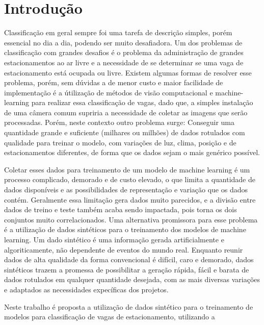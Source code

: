 \chapter{Introdução}



Classificação em geral sempre foi uma tarefa de descrição simples, porém essencial no dia a dia, podendo ser muito desafiadora. Um dos problemas de
classificação com grandes desafios é o problema da administração de grandes estacionamentos ao ar livre e a necessidade de se determinar se uma vaga de 
estacionamento está ocupada ou livre. Existem algumas formas de resolver esse problema, porém, sem dúvidas a de menor custo e maior facilidade de implementação
é a útilização de métodos de visão computacional e machine-learning para realizar essa classificação de vagas, dado que, a simples instalação de uma câmera
comum supriria a necessidade de coletar as imagens que serão processadas. Porém, neste contexto outro problema surge: Conseguir uma quantidade grande e 
suficiente (milhares ou milhões) de dados rotulados com qualidade para treinar o modelo, com variações de luz, clima, posição e de estacionamentos diferentes,
de forma que os dados sejam o mais genérico possível.

Coletar esses dados para treinamento de um modelo de machine learning é um processo complicado, demorado e de custo elevado, o que limita a quantidade de dados 
disponíveis e as possibilidades de representação e variação que os dados contém. Geralmente essa limitação gera dados muito parecidos, e a divisão entre dados
de treino e teste também acaba sendo impactada, pois torna os dois conjuntos muito correlacionados. Uma alternativa promissora para esse problema é a utilização
de dados sintéticos para o treinamento dos modelos de machine learning. Um dado sintético é uma informação gerada artificialmente e algoriticamente, não dependente 
de eventos do mundo real. Enquanto reunir dados de alta qualidade da forma convencional é difícil, caro e demorado, dados sintéticos trazem a promessa de 
possibilitar a geração rápida, fácil e barata de dados rotulados em qualquer quantidade desejada, com as mais diversas variações e adaptados as necessidades 
expecíficas dos projetos\cite{TechTarget}.

Neste trabalho é proposta a utilização de dados sintético para o treinamento de modelos para classificação de vagas de estacionamento, utilizando a 

